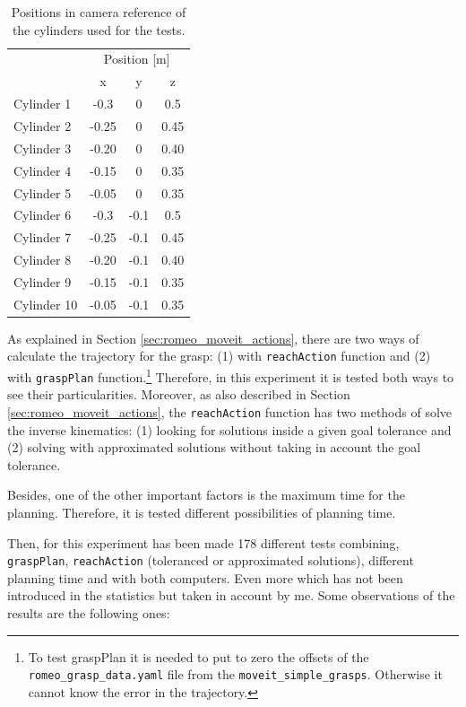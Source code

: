 \documentclass[12pt,a4paper,final,twoside,openright]{report}
\begin{document}
\begin{table}
\begin{center}
\begin{tabular}{|l|c|c|c|}
\hline
& \multicolumn{3}{|c|}{Position [m]} \\ \cline{2-4}
& x & y & z \\ \hline
Cylinder 1 & -0.3 & 0 & 0.5 \\ \hline
Cylinder 2 & -0.25 & 0 & 0.45 \\ \hline
Cylinder 3 & -0.20 & 0 & 0.40 \\ \hline
Cylinder 4 & -0.15 & 0 & 0.35 \\ \hline
Cylinder 5 & -0.05 & 0 & 0.35 \\ \hline
Cylinder 6 & -0.3 & -0.1 & 0.5 \\ \hline
Cylinder 7 & -0.25 & -0.1 & 0.45 \\ \hline
Cylinder 8 & -0.20 & -0.1 & 0.40 \\ \hline
Cylinder 9 & -0.15 & -0.1 & 0.35 \\ \hline
Cylinder 10 & -0.05 & -0.1 & 0.35 \\ \hline
\end{tabular}
\caption{Positions in camera reference of the cylinders used for the tests.\label{tab:exp_move_sim_goals}}
\end{center}
\end{table}

As explained in Section \ref{sec:romeo_moveit_actions}, there are two ways of calculate the trajectory for the grasp: (1) with \texttt{reachAction} function and (2) with \texttt{graspPlan} function.\footnote{To test graspPlan it is needed to put to zero the offsets of the \texttt{romeo\_grasp\_data.yaml} file from the \texttt{moveit\_simple\_grasps}. Otherwise it cannot know the error in the trajectory.} Therefore, in this experiment it is tested both ways to see their particularities. Moreover, as also described in Section \ref{sec:romeo_moveit_actions}, the \texttt{reachAction} function has two methods of solve the inverse kinematics: (1) looking for solutions inside a given goal tolerance and (2) solving with approximated solutions without taking in account the goal tolerance. 

Besides, one of the other important factors is the maximum time for the planning. Therefore, it is tested different possibilities of planning time.

Then, for this experiment has been made 178 different tests combining, \texttt{graspPlan}, \texttt{reachAction} (toleranced or approximated solutions), different planning time and with both computers. Even more which has not been introduced in the statistics but taken in account by me. Some observations of the results are the following ones:
\end{document}
